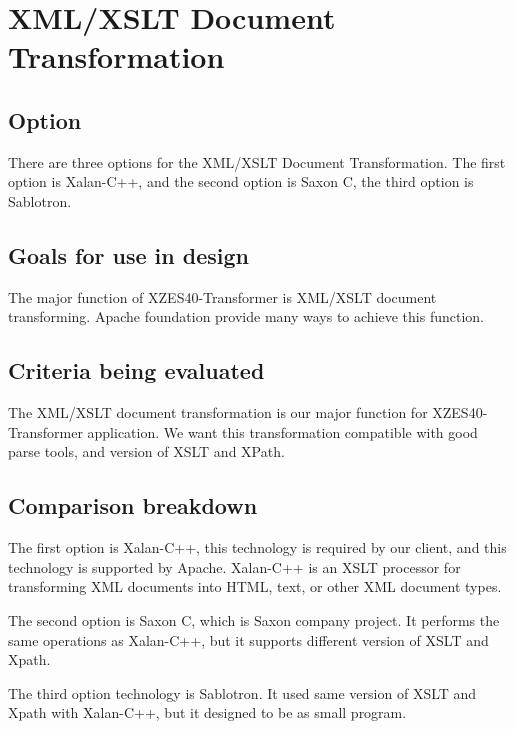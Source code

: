 \section{XML/XSLT Document Transformation}

\subsection{Option}

There are three options for the XML/XSLT Document Transformation.
The first option is Xalan-C++, and the second option is Saxon C, the third option is Sablotron.

\subsection{Goals for use in design}

The major function of XZES40-Transformer is XML/XSLT document transforming.
Apache foundation provide many ways to achieve this function.

\subsection{Criteria being evaluated}

The XML/XSLT document transformation is our major function for XZES40-Transformer application.
We want this transformation compatible with good parse tools, and version of XSLT and XPath.

\subsection{Comparison breakdown}

The first option is Xalan-C++, this technology is required by our client, and this technology is supported by Apache.
Xalan-C++ is an XSLT processor for transforming XML documents into HTML, text, or other XML document types.

The second option is Saxon C, which is Saxon company project.
It performs the same operations as Xalan-C++, but it supports different version of XSLT and Xpath.

The third option technology is Sablotron.
It used same version of XSLT and Xpath with Xalan-C++, but it designed to be as small program.

